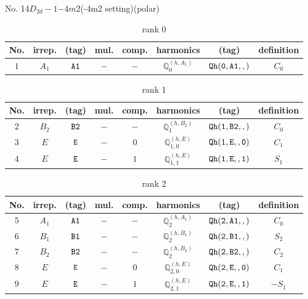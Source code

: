 \documentclass[fleqn,8pt]{jsarticle}
\begin{document}
\setcounter{MaxMatrixCols}{16}

\begin{center}
\LARGE
No. 14\quad$D_{2d}-1$\quad$-4m2$\quad(-4m2 setting)\quad[ tetragonal ] (polar)
\end{center}
\begin{table}[ht!]
\begin{center}
\caption{rank 0}
\renewcommand{\arraystretch}{1.3}
\begin{tabular}{cccccccc} \hline \hline
No. & irrep. & (tag) & mul. & comp. & harmonics & (tag) & definition \\ \hline
$ 1 $ & $ A_{1} $ & $ {\tt A1} $ & $ - $ & $ - $ & $ \mathbb{Q}_{0}^{(h,A_{1})} $ & $ {\tt Qh(0,A1,,)} $ & $ C_{0} $ \\
 \hline \hline
\end{tabular}
\end{center}
\end{table}
\begin{table}[ht!]
\begin{center}
\caption{rank 1}
\renewcommand{\arraystretch}{1.3}
\begin{tabular}{cccccccc} \hline \hline
No. & irrep. & (tag) & mul. & comp. & harmonics & (tag) & definition \\ \hline
$ 2 $ & $ B_{2} $ & $ {\tt B2} $ & $ - $ & $ - $ & $ \mathbb{Q}_{1}^{(h,B_{2})} $ & $ {\tt Qh(1,B2,,)} $ & $ C_{0} $ \\
$ 3 $ & $ E $ & $ {\tt E} $ & $ - $ & $ 0 $ & $ \mathbb{Q}_{1,0}^{(h,E)} $ & $ {\tt Qh(1,E,,0)} $ & $ C_{1} $ \\
$ 4 $ & $ E $ & $ {\tt E} $ & $ - $ & $ 1 $ & $ \mathbb{Q}_{1,1}^{(h,E)} $ & $ {\tt Qh(1,E,,1)} $ & $ S_{1} $ \\
 \hline \hline
\end{tabular}
\end{center}
\end{table}
\begin{table}[ht!]
\begin{center}
\caption{rank 2}
\renewcommand{\arraystretch}{1.3}
\begin{tabular}{cccccccc} \hline \hline
No. & irrep. & (tag) & mul. & comp. & harmonics & (tag) & definition \\ \hline
$ 5 $ & $ A_{1} $ & $ {\tt A1} $ & $ - $ & $ - $ & $ \mathbb{Q}_{2}^{(h,A_{1})} $ & $ {\tt Qh(2,A1,,)} $ & $ C_{0} $ \\
$ 6 $ & $ B_{1} $ & $ {\tt B1} $ & $ - $ & $ - $ & $ \mathbb{Q}_{2}^{(h,B_{1})} $ & $ {\tt Qh(2,B1,,)} $ & $ S_{2} $ \\
$ 7 $ & $ B_{2} $ & $ {\tt B2} $ & $ - $ & $ - $ & $ \mathbb{Q}_{2}^{(h,B_{2})} $ & $ {\tt Qh(2,B2,,)} $ & $ C_{2} $ \\
$ 8 $ & $ E $ & $ {\tt E} $ & $ - $ & $ 0 $ & $ \mathbb{Q}_{2,0}^{(h,E)} $ & $ {\tt Qh(2,E,,0)} $ & $ C_{1} $ \\
$ 9 $ & $ E $ & $ {\tt E} $ & $ - $ & $ 1 $ & $ \mathbb{Q}_{2,1}^{(h,E)} $ & $ {\tt Qh(2,E,,1)} $ & $ - S_{1} $ \\
 \hline \hline
\end{tabular}
\end{center}
\end{table}
\end{document}
